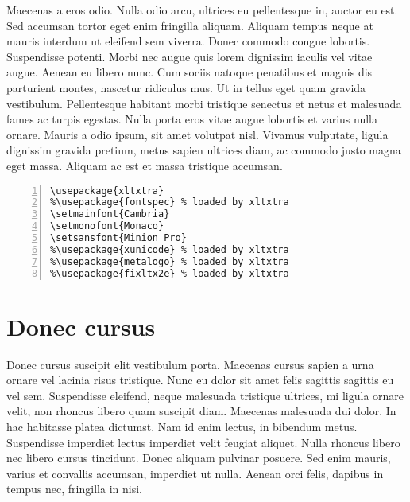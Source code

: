 Maecenas a eros odio. Nulla odio arcu, ultrices eu pellentesque in, auctor eu est. Sed accumsan tortor eget enim fringilla aliquam. Aliquam tempus neque at mauris interdum ut eleifend sem viverra. Donec commodo congue lobortis. Suspendisse potenti. Morbi nec augue quis lorem dignissim iaculis vel vitae augue. Aenean eu libero nunc. Cum sociis natoque penatibus et magnis dis parturient montes, nascetur ridiculus mus. Ut in tellus eget quam gravida vestibulum. Pellentesque habitant morbi tristique senectus et netus et malesuada fames ac turpis egestas. Nulla porta eros vitae augue lobortis et varius nulla ornare. Mauris a odio ipsum, sit amet volutpat nisl. Vivamus vulputate, ligula dignissim gravida pretium, metus sapien ultrices diam, ac commodo justo magna eget massa. Aliquam ac est et massa tristique accumsan. 

\begin{Verbatim}[numbers=left, framerule=1pt]
% see http://www.ctan.org/tex-archive/macros/xetex/latex/xltxtra/xltxtra.pdf
\usepackage{xltxtra} 
%\usepackage{fontspec} % loaded by xltxtra
\setmainfont{Cambria}
\setmonofont{Monaco}
\setsansfont{Minion Pro}
%\usepackage{xunicode} % loaded by xltxtra
%\usepackage{metalogo} % loaded by xltxtra
%\usepackage{fixltx2e} % loaded by xltxtra
\end{Verbatim}

\section{Donec cursus}

Donec cursus suscipit elit vestibulum porta. Maecenas cursus sapien a urna ornare vel lacinia risus tristique. Nunc eu dolor sit amet felis sagittis sagittis eu vel sem. Suspendisse eleifend, neque malesuada tristique ultrices, mi ligula ornare velit, non rhoncus libero quam suscipit diam. Maecenas malesuada dui dolor. In hac habitasse platea dictumst. Nam id enim lectus, in bibendum metus. Suspendisse imperdiet lectus imperdiet velit feugiat aliquet. Nulla rhoncus libero nec libero cursus tincidunt. Donec aliquam pulvinar posuere. Sed enim mauris, varius et convallis accumsan, imperdiet ut nulla. Aenean orci felis, dapibus in tempus nec, fringilla in nisi. 

\newcommand{\mcol}[2]{\multicolumn{#1}{c}{#2}}
\newcommand{\mcoll}[2]{\multicolumn{#1}{@{}l@{}}{#2}}

\newcommand{\emptycell}{\mcol{3}{---}}
\newcommand{\minussign}{-}

